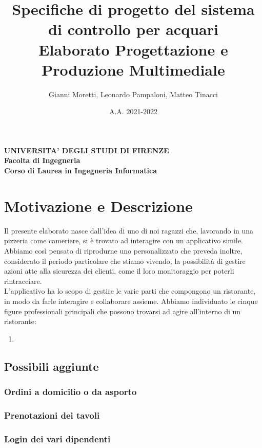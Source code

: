 \documentclass{article}
\title{\LARGE Specifiche di progetto del sistema di controllo per acquari \\
\large Elaborato Progettazione e Produzione Multimediale}
\author{Gianni Moretti, Leonardo Pampaloni, Matteo Tinacci}
\date{A.A. 2021-2022}
\begin{document}
\maketitle

\begin{center}
\textbf{\large UNIVERSITA' DEGLI STUDI DI FIRENZE \\
Facolta di Ingegneria \\
\normalsize Corso di Laurea in Ingegneria Informatica}
\end{center}


\newpage

\tableofcontents

\newpage

\section{Motivazione e Descrizione}
Il presente elaborato nasce dall'idea di uno di noi ragazzi che, lavorando in una pizzeria come cameriere, si \`e trovato ad interagire con un applicativo simile. Abbiamo cos\`i pensato di riprodurne uno personalizzato che preveda inoltre, considerato il periodo particolare che stiamo vivendo, la possibilit\`a di gestire azioni atte alla sicurezza dei clienti, come il loro monitoraggio per poterli rintracciare. \\
L'applicativo ha lo scopo di gestire le varie parti che compongono un ristorante, in modo da farle interagire e collaborare assieme. Abbiamo individuato le cinque figure professionali principali che possono trovarsi ad agire all'interno di un ristorante:

\begin{enumerate}
\item 
\end{enumerate}

\subsection{Possibili aggiunte}

\subsubsection{Ordini a domicilio o da asporto}

\subsubsection{Prenotazioni dei tavoli}  

\subsubsection{Login dei vari dipendenti}


\newpage
\end{document}

